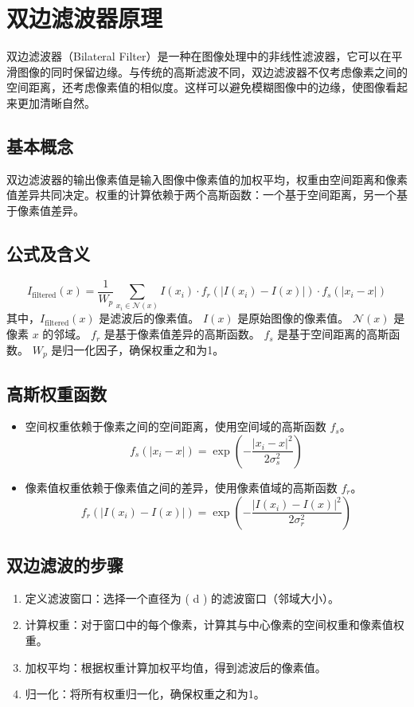 \documentclass[a4paper,12pt]{report}
\begin{document}
\section{双边滤波器原理}
双边滤波器（Bilateral Filter）是一种在图像处理中的非线性滤波器，它可以在平滑图像的同时保留边缘。与传统的高斯滤波不同，双边滤波器不仅考虑像素之间的空间距离，还考虑像素值的相似度。这样可以避免模糊图像中的边缘，使图像看起来更加清晰自然。
\subsection{基本概念}
双边滤波器的输出像素值是输入图像中像素值的加权平均，权重由空间距离和像素值差异共同决定。权重的计算依赖于两个高斯函数：一个基于空间距离，另一个基于像素值差异。

\subsection{公式及含义}

\begin{equation}
    I_{\text{filtered}}(x) = \frac{1}{W_p} \sum_{x_i \in \mathcal{N}(x)} I(x_i) \cdot f_r(|I(x_i) - I(x)|) \cdot f_s(|x_i - x|)
\end{equation}
其中，$I_{\text{filtered}}(x)$ 是滤波后的像素值。
$I(x)$ 是原始图像的像素值。
$\mathcal{N}(x)$ 是像素 $x$ 的邻域。
$f_r$ 是基于像素值差异的高斯函数。
$f_s$ 是基于空间距离的高斯函数。
$W_p$ 是归一化因子，确保权重之和为1。

\subsection{高斯权重函数}
\begin{itemize}
    \item 空间权重依赖于像素之间的空间距离，使用空间域的高斯函数 $f_s$。
        \begin{equation}
        f_s(|x_i - x|) = \exp\left(-\frac{|x_i - x|^2}{2 \sigma_s^2}\right) 
        \end{equation}
    \item 像素值权重依赖于像素值之间的差异，使用像素值域的高斯函数 $f_r$。
        \begin{equation}
        f_r(|I(x_i) - I(x)|) = \exp\left(-\frac{|I(x_i) - I(x)|^2}{2 \sigma_r^2}\right) 
        \end{equation}
\end{itemize}

\subsection{双边滤波的步骤}
\begin{enumerate}
    \item 定义滤波窗口：选择一个直径为 ( d ) 的滤波窗口（邻域大小）。
    \item 计算权重：对于窗口中的每个像素，计算其与中心像素的空间权重和像素值权重。
    \item 加权平均：根据权重计算加权平均值，得到滤波后的像素值。
    \item 归一化：将所有权重归一化，确保权重之和为1。
\end{enumerate}
\end{document}

